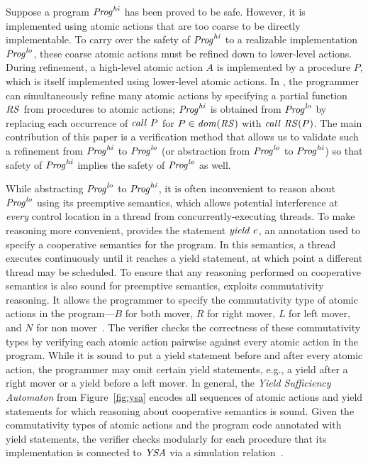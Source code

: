 \newcommand{\hi}{\mathit{hi}}
\newcommand{\lo}{\mathit{lo}}

Suppose a program $\Prog^\hi$ has been proved to be safe.
However, it is implemented using atomic actions that are too coarse to be directly implementable.  
To carry over the safety of $\Prog^\hi$ to a realizable implementation $\Prog^\lo$, 
these coarse atomic actions must be refined down to lower-level actions.
During refinement, a high-level atomic action $A$ is implemented by a procedure $P$, which is itself implemented using lower-level atomic actions.
In \civl, the programmer can simultaneously refine many atomic actions by specifying a partial function $\mathit{RS}$ from procedures to atomic actions;
$\Prog^\hi$ is obtained from $\Prog^\lo$ by replacing each occurrence of $\mathit{call}\ P$ for $P \in \mathit{dom}(\mathit{RS})$ with $\mathit{call}\ \mathit{RS}(P)$.
The main contribution of this paper is a verification method that allows us to validate such a refinement from 
$\Prog^\hi$ to $\Prog^\lo$ (or abstraction from $\Prog^\lo$ to $\Prog^\hi$) so that 
safety of $\Prog^\hi$ implies the safety of $\Prog^\lo$ as well.

While abstracting $\Prog^\lo$ to $\Prog^\hi$, it is often inconvenient to 
reason about $\Prog^\lo$ using its preemptive semantics, which allows potential interference 
at {\em every\/} control location in a thread from concurrently-executing threads.
To make reasoning more convenient, \civl provides the statement $\mathit{yield}\ e$, an annotation 
used to specify a cooperative semantics for the program.
In this semantics, a thread executes continuously until it reaches a yield statement, 
at which point a different thread may be scheduled.
To ensure that any reasoning performed on cooperative semantics is also sound for preemptive semantics,
\civl exploits commutativity reasoning.
It allows the programmer to specify 
the commutativity type of atomic actions in the program---$B$ for both mover, $R$ for right mover, $L$ for left mover, 
and $N$ for non mover~\cite{FlanaganFLQ08}. 
The \civl verifier checks the correctness of these commutativity types by verifying each atomic action pairwise against 
every atomic action in the program.
While it is sound to put a yield statement before and after every atomic action,
the programmer may omit certain yield statements, e.g., a yield after a right mover or a yield before a left mover.
In general, the {\em Yield Sufficiency Automaton\/} from Figure~\ref{fig:ysa} encodes 
all sequences of atomic actions and yield statements for which reasoning about cooperative semantics is sound.
Given the commutativity types of atomic actions and the program code annotated with yield statements,
the \civl verifier checks modularly for each procedure that its implementation is connected to $\mathit{YSA}$
via a simulation relation~\cite{HenzingerHK95}.

